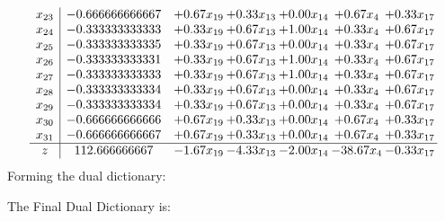 \documentclass[8pt]{article}
\begin{document}
\[\begin{array}{c| c c@{\hskip 2pt} c@{\hskip 2pt} c@{\hskip 2pt} c@{\hskip 2pt} c@{\hskip 2pt} }
 x_{23}   &  -0.666666666667 & +  0.67 x_{19} & +  0.33 x_{13} & +  0.00 x_{14} & +  0.67 x_{4} & +  0.33 x_{17}\\
 x_{24}   &  -0.333333333333 & +  0.33 x_{19} & +  0.67 x_{13} & +  1.00 x_{14} & +  0.33 x_{4} & +  0.67 x_{17}\\
 x_{25}   &  -0.333333333335 & +  0.33 x_{19} & +  0.67 x_{13} & +  0.00 x_{14} & +  0.33 x_{4} & +  0.67 x_{17}\\
 x_{26}   &  -0.333333333331 & +  0.33 x_{19} & +  0.67 x_{13} & +  1.00 x_{14} & +  0.33 x_{4} & +  0.67 x_{17}\\
 x_{27}   &  -0.333333333333 & +  0.33 x_{19} & +  0.67 x_{13} & +  1.00 x_{14} & +  0.33 x_{4} & +  0.67 x_{17}\\
 x_{28}   &  -0.333333333334 & +  0.33 x_{19} & +  0.67 x_{13} & +  0.00 x_{14} & +  0.33 x_{4} & +  0.67 x_{17}\\
 x_{29}   &  -0.333333333334 & +  0.33 x_{19} & +  0.67 x_{13} & +  0.00 x_{14} & +  0.33 x_{4} & +  0.67 x_{17}\\
 x_{30}   &  -0.666666666666 & +  0.67 x_{19} & +  0.33 x_{13} & +  0.00 x_{14} & +  0.67 x_{4} & +  0.33 x_{17}\\
 x_{31}   &  -0.666666666667 & +  0.67 x_{19} & +  0.33 x_{13} & +  0.00 x_{14} & +  0.67 x_{4} & +  0.33 x_{17}\\
\hline
z    &  112.666666667 & -1.67 x_{19} & -4.33 x_{13} & -2.00 x_{14} & -38.67 x_{4} & -0.33 x_{17}\\
\end{array}\]
Forming the dual dictionary:

The Final Dual Dictionary is: 
\end{document}
